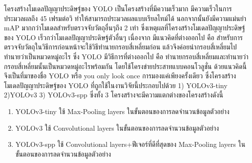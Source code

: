 โครงสร้างโมเดลปัญญาประดิษฐ์ของ YOLO เป็นโครงสร้างที่มีความเร็วมาก มีความเร็วในการประมวลผลถึง 45 เฟรมต่อวิ ทำให้สามารถประมวลผลแบบเรียลไทม์ได้ นอกจากนั้นยังมีความแม่นยำ mAP มากกว่าโมเดลสำหรับตรวจจับวัตถุอื่นๆถึง 2 เท่า ซึ่งเหตุผลที่โครงสร้างโมเดลปัญญาประดิษฐ์ของ YOLO เร็วกว่าโมเดลปัญญาประดิษฐ์ตัวอื่นๆ เนื่องจาก มีแนวคิดที่ต่างออกไป คือ สำหรับการตรวจจับวัตถุในวิธีการก่อนหน้าจะใช้วิธีทำนายกรอบสี่เหลี่ยมก่อน แล้วจึงค่อยนำกรอบสี่เหลี่ยมไปทำนายว่าเป็นหมวดหมู่อะไร ซึ่ง YOLO มีวิธีการที่ต่างออกไป คือ ทำนายกรอบสี่เหลี่ยมและทำนายว่ากรอบสี่เหลี่ยมนั้นเป็นหมวดหมู่อะไรพร้อมกัน โดยใช้โครงข่ายประสาทแบบคอนโวลูชั่น ด้วยแนวคิดนี้จึงเป็นที่มาของชื่อ YOLO หรือ you only look once การมองแค่เพียงครั้งเดียว ซึ่งโครงสร้างโมเดลปัญญาประดิษฐ์ของ YOLO ที่ถูกใช้ในงานวิจัยนี้ประกอบไปด้วย 1) YOLOv3-tiny 2)YOLOv3 3) YOLOv3-spp	ซึ่งทั้ง 3 โครงสร้างจะมีความแตกต่างของโครงสร้างดังนี้
\begin{enumerate}
	\setlength\itemsep{-0.25em}
	\item YOLOv3-tiny ใช้ Max-Pooling layers ในขั้นตอนของการลดจำนวนข้อมูลตัวอย่าง
	\item YOLOv3 ใช้ Convolutional layers ในขั้นตอนของการลดจำนวนข้อมูลตัวอย่าง
	\item YOLOv3-spp ใช้ Convolutional layers+ฟีเจอร์ที่ดีที่สุดของ Max-Pooling layers ในขั้นตอนของการลดจำนวนข้อมูลตัวอย่าง
\end{enumerate}

